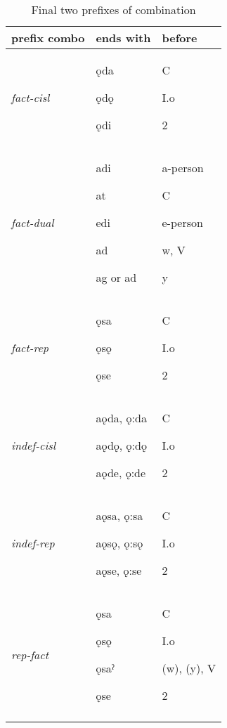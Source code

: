 
\begin{table}
\caption{Final two prefixes of combination}
\label{tab:1:finaldoubleprefix}
\scriptsize{
\begin{tabularx}{\textwidth}{XXX}
\lsptoprule
prefix combo & ends with & before\\
\midrule
{\itshape fact-cisl} & ǫda

ǫdǫ

ǫdi & C

I.o 

2 

\\
{\itshape fact-dual} & adi

at

edi

ad

ag or ad & a-person 

C

e-person 

w, V

y

\\
{\itshape fact-rep} & ǫsa

ǫsǫ

ǫse & C

I.o 

2\\
{\itshape indef-cisl} & aǫda, ǫ:da

aǫdǫ, ǫ:dǫ

aǫde, ǫ:de & C

I.o 

2

\\
{\itshape indef-rep} & aǫsa, ǫ:sa

aǫsǫ, ǫ:sǫ

aǫse, ǫ:se & C

I.o 

2

\\
{\itshape rep-fact} & ǫsa

ǫsǫ

ǫsaˀ

ǫse & C

I.o 

(w), (y), V 

2\\
\lspbottomrule
\end{tabularx}}
\end{table}



